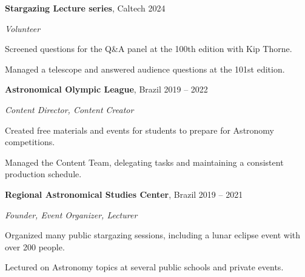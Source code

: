 \begin{entry}
  {{\bf Stargazing Lecture series}, Caltech}
  {2024}

  {\em Volunteer}
  
  Screened questions for the Q\&A panel at the 100th edition with Kip Thorne.

  Managed a telescope and answered audience questions at the 101st edition.
\end{entry}

\vspace*{0.1cm}

\begin{entry}
  {{\bf Astronomical Olympic League}, Brazil}
  {2019 -- 2022}

  {\em Content Director, Content Creator}

  Created free materials and events for students to prepare for Astronomy competitions.

  Managed the Content Team, delegating tasks and maintaining a consistent production schedule.
\end{entry}

\vspace*{0.1cm}

\begin{entry}
  {{\bf Regional Astronomical Studies Center}, Brazil}
  {2019 -- 2021}

  {\em Founder, Event Organizer, Lecturer}
  
  Organized many public stargazing sessions, including a lunar eclipse event with over 200 people.
  
  Lectured on Astronomy topics at several public schools and private events.
\end{entry}
